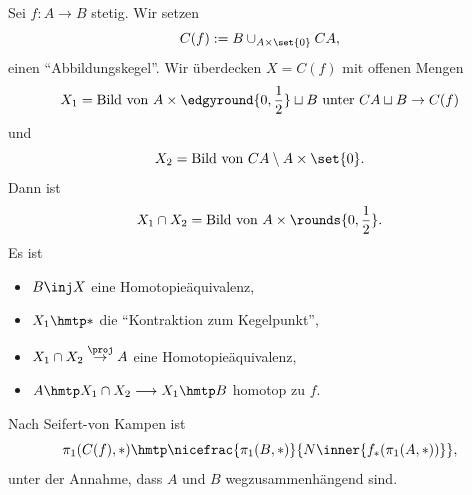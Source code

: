 \documentclass[language=ngerman]{TemplateLecture} %
\begin{document}
\begin{example}
\begin{enumerate}[$(i)$]
        Sei $f: A \to B$ stetig. Wir setzen 
        \begin{equation*}
            C(f) := B \cup_{A \times \set{0}} CA,
        \end{equation*}
        einen \enquote{Abbildungskegel}. Wir überdecken $X = C(f)$ mit offenen Mengen
        \begin{equation*}
            X_1 = \text{Bild von $A \times \edgyround{0,\frac{1}{2}} \sqcup B$ unter} ~ CA \sqcup B \to C(f)
        \end{equation*}
        und
        \begin{equation*}
            X_2 = \text{Bild von $CA \setminus A \times \set{0}$.}
        \end{equation*}
        Dann ist 
        \begin{equation*}
            X_1 \cap X_2 = \text{Bild von } A \times \rounds{0,\frac{1}{2}}.
        \end{equation*}
        Es ist 
        \begin{itemize}
            \item $B \inj X$ eine Homotopieäquivalenz,
            \item $X_1 \hmtp *$ die \enquote{Kontraktion zum Kegelpunkt},
            \item $X_1 \cap X_2 \overset{\proj}{\to} A$ eine Homotopieäquivalenz,
            \item $A \hmtp X_1 \cap X_2 \longrightarrow X_1 \hmtp B$ homotop zu $f$.
        \end{itemize}
        Nach Seifert-von Kampen ist
        \begin{equation*}
            \pi_1(C(f), *) \hmtp \nicefrac{\pi_1(B, *)}{N\inner{f_*(\pi_1(A, *))}},
        \end{equation*}
        unter der Annahme, dass $A$ und $B$ wegzusammenhängend sind.
    \end{enumerate}
\end{example}
\end{document}
